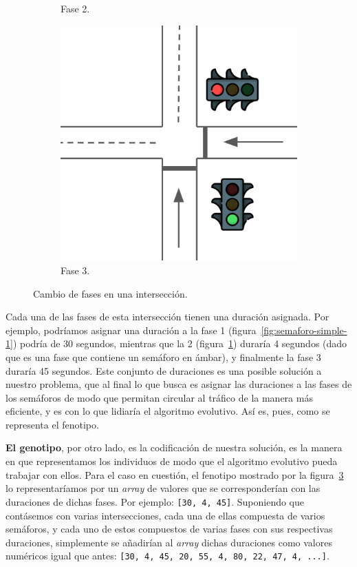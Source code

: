 \begin{figure}[ht]
\begin{subfigure}[t]{0.32\textwidth}
        \caption{Fase 2.}
        \label{fig:semaforo-simple-2}
    \end{subfigure}
    \hfill
    \begin{subfigure}[t]{0.32\textwidth}
        \centering
        \includegraphics[width=\textwidth]{report/images/semaforossimple3.png}
        \caption{Fase 3.}
        \label{fig:semaforo-simple-3}
    \end{subfigure}
    \caption{Cambio de fases en una intersección.}
    \label{fig:semaforo-simple}
\end{figure}

Cada una de las fases de esta intersección tienen una duración asignada. Por ejemplo, podríamos asignar una duración a la fase 1 (figura~\ref{fig:semaforo-simple-1}) podría de 30 segundos, mientras que la 2 (figura~\ref{fig:semaforo-simple-2}) duraría 4 segundos (dado que es una fase que contiene un semáforo en ámbar), y finalmente la fase 3 duraría 45 segundos. Este conjunto de duraciones es una posible solución a nuestro problema, que al final lo que busca es asignar las duraciones a las fases de los semáforos de modo que permitan circular al tráfico de la manera más eficiente, y es con lo que lidiaría el algoritmo evolutivo. Así es, pues, como se representa el fenotipo.

\textbf{El genotipo}, por otro lado, es la codificación de nuestra solución, es la manera en que representamos los individuos de modo que el algoritmo evolutivo pueda trabajar con ellos. Para el caso en cuestión, el fenotipo mostrado por la figura~\ref{fig:semaforo-simple} lo representaríamos por un \textit{array} de valores que se corresponderían con las duraciones de dichas fases. Por ejemplo: \texttt{[30, 4, 45]}. Suponiendo que contásemos con varias intersecciones, cada una de ellas compuesta de varios semáforos, y cada uno de estos compuestos de varias fases con sus respectivas duraciones, simplemente se añadirían al \textit{array} dichas duraciones como valores numéricos igual que antes: \texttt{[30, 4, 45, 20, 55, 4, 80, 22, 47, 4, ...]}.

